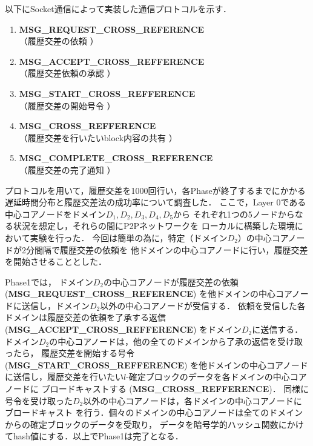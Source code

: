 \documentclass[a4paper,12pt]{jsarticle}
\begin{document}
以下にSocket通信によって実装した通信プロトコルを示す．

\hspace{5mm}
%
\begin{enumerate}
\item \textbf{MSG\_REQUEST\_CROSS\_REFERENCE}\\
\hspace{12mm} （履歴交差の依頼 ）
\item \textbf{MSG\_ACCEPT\_CROSS\_REFFERENCE}\\
\hspace{12mm}  （履歴交差依頼の承認 ）
  \item \textbf{MSG\_START\_CROSS\_REFFERENCE}\\
\hspace{12mm}  （履歴交差の開始号令 ）
  \item \textbf{MSG\_CROSS\_REFFERENCE}\\
\hspace{12mm}  （履歴交差を行いたいblock内容の共有 ）
  \item \textbf{MSG\_COMPLETE\_CROSS\_REFERENCE}\\
\hspace{12mm}  （履歴交差の完了通知 ）
\end{enumerate}
%
\hspace{5mm}

プロトコルを用いて，履歴交差を1000回行い，各Phaseが終了するまでにかかる
遅延時間分布と履歴交差法の成功率について調査した．
ここで，Layer 0である中心コアノードをドメイン$D_1, D_2, D_3, D_4, D_5$から
それぞれ1つの5ノードからなる状況を想定し，それらの間にP2Pネットワークを
ローカルに構築した環境において実験を行った．
今回は簡単の為に，特定（ドメイン$D_2$）の中心コアノードが2分間隔で履歴交差の依頼を
他ドメインの中心コアノードに行い，履歴交差を開始させることとした．

Phase1では，
ドメイン$D_2$の中心コアノードが履歴交差の依頼 (\textbf{MSG\_REQUEST\_CROSS\_REFERENCE})
を他ドメインの中心コアノードに送信し，ドメイン$D_2$以外の中心コアノードが受信する．
依頼を受信した各ドメインは履歴交差の依頼を了承する返信 (\textbf{MSG\_ACCEPT\_CROSS\_REFFERENCE})
をドメイン$D_2$に送信する．
ドメイン$D_2$の中心コアノードは，他の全てのドメインから了承の返信を受け取ったら，
履歴交差を開始する号令 (\textbf{MSG\_START\_CROSS\_REFFERENCE}) を他ドメインの中心コアノード
に送信し，履歴交差を行いたい$l$-確定ブロックのデータを各ドメインの中心コアノードに
ブロードキャストする (\textbf{MSG\_CROSS\_REFFERENCE})．
同様に号令を受け取った$D_2$以外の中心コアノードは，各ドメインの中心コアノードにブロードキャスト
を行う．個々のドメインの中心コアノードは全てのドメインからの確定ブロックのデータを受取り，
データを暗号学的ハッシュ関数にかけてhash値にする．以上でPhase1は完了となる．
\end{document}
